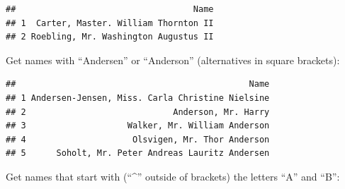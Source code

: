 \documentclass[]{book}
\makeatletter
\newenvironment{Shaded}{\begin{snugshade}}{\end{snugshade}}
\newcommand{\KeywordTok}[1]{\textcolor[rgb]{0.13,0.29,0.53}{\textbf{{#1}}}}
\newcommand{\DecValTok}[1]{\textcolor[rgb]{0.00,0.00,0.81}{{#1}}}
\newcommand{\StringTok}[1]{\textcolor[rgb]{0.31,0.60,0.02}{{#1}}}
\newcommand{\NormalTok}[1]{{#1}}
\newenvironment{kframe}{%
\medskip{}
\setlength{\fboxsep}{.8em}
 \def\at@end@of@kframe{}%
 \ifinner\ifhmode%
  \def\at@end@of@kframe{\end{minipage}}%
  \begin{minipage}{\columnwidth}%
 \fi\fi%
 \def\FrameCommand##1{\hskip\@totalleftmargin \hskip-\fboxsep
 \colorbox{shadecolor}{##1}\hskip-\fboxsep
     \hskip-\linewidth \hskip-\@totalleftmargin \hskip\columnwidth}%
 \MakeFramed {\advance\hsize-\width
   \@totalleftmargin\z@ \linewidth\hsize
   \@setminipage}}%
 {\par\unskip\endMakeFramed%
 \at@end@of@kframe}
\renewenvironment{Shaded}{\begin{kframe}}{\end{kframe}}
\makeatother
\begin{document}
\begin{Shaded}
\end{Shaded}

\begin{verbatim}
##                                   Name
## 1  Carter, Master. William Thornton II
## 2 Roebling, Mr. Washington Augustus II
\end{verbatim}

Get names with ``Andersen'' or ``Anderson'' (alternatives in square
brackets):

\begin{Shaded}
\end{Shaded}

\begin{verbatim}
##                                              Name
## 1 Andersen-Jensen, Miss. Carla Christine Nielsine
## 2                             Anderson, Mr. Harry
## 3                    Walker, Mr. William Anderson
## 4                     Olsvigen, Mr. Thor Anderson
## 5      Soholt, Mr. Peter Andreas Lauritz Andersen
\end{verbatim}

Get names that start with (``\^{}'' outside of brackets) the letters
``A'' and ``B'':

\begin{Shaded}
\end{Shaded}
\end{document}
